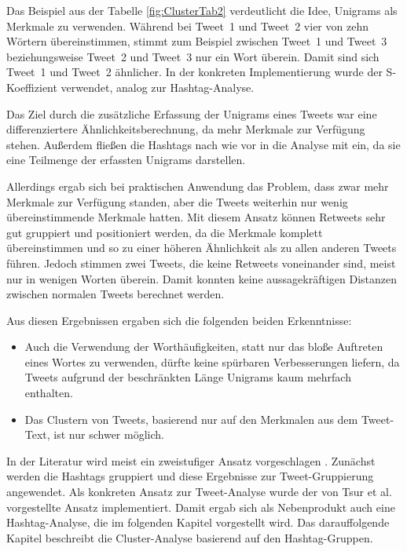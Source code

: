 Das Beispiel aus der Tabelle \ref{fig:ClusterTab2} verdeutlicht die Idee, Unigrams als Merkmale zu verwenden. Während bei Tweet~1 und Tweet~2 vier von zehn Wörtern übereinstimmen, stimmt zum Beispiel zwi\-schen Tweet~1 und Tweet~3 beziehungsweise Tweet~2 und Tweet~3 nur ein Wort überein. Damit sind sich Tweet~1 und Tweet~2 ähnlicher. In der konkreten Implementierung wurde der S-Koeffizient verwendet, analog zur Hashtag-Analyse.

Das Ziel durch die zusätzliche Erfassung der Unigrams eines Tweets war eine differenziertere Ähnlichkeitsberechnung, da mehr Merkmale zur Verfügung stehen. Außerdem fließen die Hashtags nach wie vor in die Analyse mit ein, da sie eine Teilmenge der erfassten Unigrams darstellen.

Allerdings ergab sich bei praktischen Anwendung das Problem, dass zwar mehr Merkmale zur Verfügung standen, aber die Tweets weiterhin nur wenig übereinstimmende Merkmale hatten. 
Mit diesem Ansatz können Retweets sehr gut gruppiert und positioniert werden, da die Merkmale komplett übereinstimmen und so zu einer höheren Ähnlichkeit als zu allen anderen Tweets führen. Jedoch stimmen zwei Tweets, die keine Retweets voneinander sind, meist nur in wenigen Worten überein. Damit konnten keine aussagekräftigen Distanzen zwi\-schen normalen Tweets berechnet werden. 

Aus diesen Ergebnissen ergaben sich die folgenden beiden Erkenntnisse:
\begin{itemize}
\item Auch die Verwendung der Worthäufigkeiten, statt nur das bloße Auftreten eines Wortes zu verwenden, dürfte keine spürbaren Verbesserungen liefern, da Tweets aufgrund der beschränkten Länge Unigrams kaum mehrfach enthalten. 
\item Das Clustern von Tweets, basierend nur auf den Merkmalen aus dem Tweet-Text, ist nur schwer möglich.
\end{itemize}

In der Literatur wird meist ein zweistufiger Ansatz vorgeschlagen \cite{TsurLittman, Antenucci}. Zunächst werden die Hashtags gruppiert und diese Ergebnisse zur Tweet-Gruppierung angewendet. Als konkreten Ansatz zur Tweet-Analyse wurde der von Tsur et al. vorgestellte Ansatz \cite{TsurLittman} implementiert. Damit ergab sich als Nebenprodukt auch eine Hashtag-Analyse, die im folgenden Kapitel vorgestellt wird. Das darauffolgende Kapitel beschreibt die Cluster-Analyse basierend auf den Hashtag-Gruppen.

